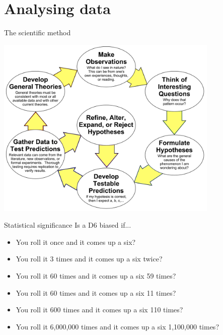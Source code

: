 \part{Analysing data}
\frame{\partpage}


\begin{frame}{The scientific method}
	\begin{center}
		\includegraphics[width=0.8\textwidth]{scientific_method}
	\end{center}
\end{frame}

\begin{frame}{Statistical significance}
	\pause Is a D6 biased if...
	\begin{itemize}
		\pause\item You roll it once and it comes up a six?
		\pause\item You roll it 3 times and it comes up a six twice?
		\pause\item You roll it 60 times and it comes up a six 59 times?
		\pause\item You roll it 60 times and it comes up a six 11 times?
		\pause\item You roll it 600 times and it comes up a six 110 times?
		\pause\item You roll it 6,000,000 times and it comes up a six 1,100,000 times?
	\end{itemize}
\end{frame}

